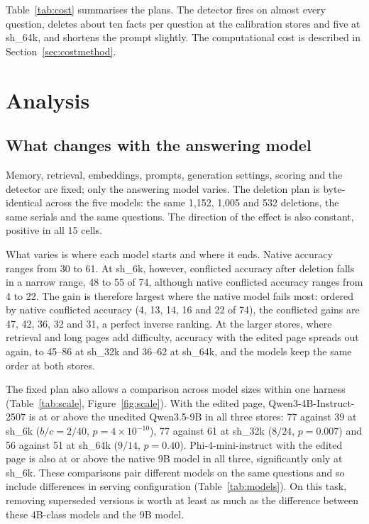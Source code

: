 \documentclass{CUP-JNL-NLP}
\newcommand{\sub}[1]{\textsf{sh\_#1}}                    %
\begin{document}
Table~\ref{tab:cost} summarises the plans. The detector fires on almost every question, deletes about ten facts per question at the calibration stores and five at \sub{64k}, and shortens the prompt slightly. The computational cost is described in Section~\ref{sec:costmethod}.

\section{Analysis}
\label{sec:analysis}

\subsection{What changes with the answering model}
\label{sec:substitution}

Memory, retrieval, embeddings, prompts, generation settings, scoring and the detector are fixed; only the answering model varies. The deletion plan is byte-identical across the five models: the same 1,152, 1,005 and 532 deletions, the same serials and the same questions. The direction of the effect is also constant, positive in all 15 cells.

What varies is where each model starts and where it ends. Native accuracy ranges from 30 to 61. At \sub{6k}, however, conflicted accuracy after deletion falls in a narrow range, 48 to 55 of 74, although native conflicted accuracy ranges from 4 to 22. The gain is therefore largest where the native model fails most: ordered by native conflicted accuracy (4, 13, 14, 16 and 22 of 74), the conflicted gains are 47, 42, 36, 32 and 31, a perfect inverse ranking. At the larger stores, where retrieval and long pages add difficulty, accuracy with the edited page spreads out again, to 45--86 at \sub{32k} and 36--62 at \sub{64k}, and the models keep the same order at both stores.

The fixed plan also allows a comparison across model sizes within one harness (Table~\ref{tab:scale}, Figure~\ref{fig:scale}). With the edited page, Qwen3-4B-Instruct-2507 is at or above the unedited Qwen3.5-9B in all three stores: 77 against 39 at \sub{6k} ($b/c=2/40$, $p=4\times10^{-10}$), 77 against 61 at \sub{32k} ($8/24$, $p=0.007$) and 56 against 51 at \sub{64k} ($9/14$, $p=0.40$). Phi-4-mini-instruct with the edited page is also at or above the native 9B model in all three, significantly only at \sub{6k}. These comparisons pair different models on the same questions and so include differences in serving configuration (Table~\ref{tab:models}). On this task, removing superseded versions is worth at least as much as the difference between these 4B-class models and the 9B model.
\end{document}
